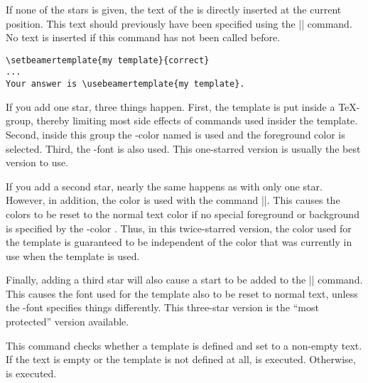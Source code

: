 \begin{command}{\usebeamertemplate\opt{|***|}}
  If none of the stars is given, the text of the 
  is directly inserted at the current position. This text should
  previously have been specified using the |\setbeamertemplate|
  command. No text is inserted if this command has not been called
  before.
  \example
\begin{verbatim}
\setbeamertemplate{my template}{correct}
...
Your answer is \usebeamertemplate{my template}.
\end{verbatim}

  If you add one star, three things happen. First, the template is put
  inside a \TeX-group, thereby limiting most side effects of commands
  used insider the template. Second, inside this group the
  \beamer-color named  is used and the foreground
  color is selected. Third, the \beamer-font  is
  also used. This one-starred version is usually the best version to
  use.

  If you add a second star, nearly the same happens as with only one
  star. However, in addition, the color is used with the command
  |\setbeamercolor*|. This causes the colors to be reset to the normal
  text color if no special foreground or background is specified by
  the \beamer-color . Thus, in this twice-starred
  version, the color used for the template is guaranteed to be
  independent of the color that was currently in use when the template
  is used.

  Finally, adding a third star will also cause a start to be added to
  the |\setbeamerfont*| command. This causes the font used for the
  template also to be reset to normal text, unless the \beamer-font
   specifies things differently. This three-star
  version is the ``most protected'' version available.
\end{command}

\begin{command}{\ifbeamertemplateempty{}}
  This command checks whether a template is defined and set to a    
  non-empty text. If the text is empty or the template is not
  defined at all,  is executed. Otherwise,
   is executed. 
\end{command}


